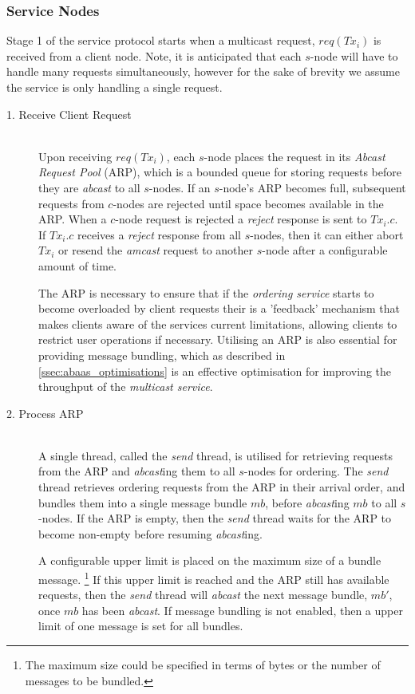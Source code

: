     \subsubsection*{Service Nodes}
    Stage 1 of the service protocol starts when a multicast request, $req(Tx_i)$ is received from a client node.  Note, it is anticipated that each $s$-node will have to handle many requests simultaneously, however for the sake of brevity we assume the service is only handling a single request.  
    
    \begin{description}
        \item[1. Receive Client Request] \hfill \\
            Upon receiving $req(Tx_i)$, each $s$-node places the request in its \emph{Abcast Request Pool} (ARP), which is a bounded queue for storing requests before they are \emph{abcast} to all $s$-nodes.  If an $s$-node's ARP becomes full, subsequent requests from $c$-nodes are rejected until space becomes available in the ARP.  When a $c$-node request is rejected a \emph{reject} response is sent to $Tx_i.c$.  If $Tx_i.c$ receives a \emph{reject} response from all $s$-nodes, then it can either abort $Tx_i$ or resend the \emph{amcast} request to another $s$-node after a configurable amount of time.    
            
            The ARP is necessary to ensure that if the \emph{ordering service} starts to become overloaded by client requests their is a 'feedback' mechanism that makes clients aware of the services current limitations, allowing clients to restrict user operations if necessary.  Utilising an ARP is also essential for providing message bundling, which as described in \ref{ssec:abaas_optimisations} is an effective optimisation for improving the throughput of the \emph{multicast service}.  
            
        \item[2. Process ARP] \hfill \\
        A single thread, called the \emph{send} thread, is utilised for retrieving requests from the ARP and \emph{abcast}ing them to all $s$-nodes for ordering.  The \emph{send} thread retrieves ordering requests from the ARP in their arrival order, and bundles them into a single message bundle $mb$, before \emph{abcast}ing $mb$ to all $s$-nodes.  If the ARP is empty, then the \emph{send} thread waits for the ARP to become non-empty before resuming \emph{abcast}ing.  
		
		A configurable upper limit is placed on the maximum size of a bundle message. \footnote{The maximum size could be specified in terms of bytes or the number of messages to be bundled.} If this upper limit is reached and the ARP still has available requests, then the \emph{send} thread will \emph{abcast} the next message bundle, $mb'$, once $mb$ has been \emph{abcast}.  If message bundling is not enabled, then a upper limit of one message is set for all bundles.    
		

\end{description}
